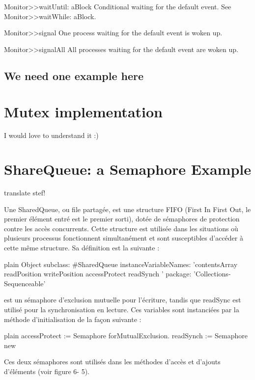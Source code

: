 \documentclass[10pt,twoside,english]{_support/latex/sbabook/sbabook}
\begin{document}
Monitor\textgreater{}\textgreater{}waitUntil: aBlock
Conditional waiting for the default event.
See Monitor\textgreater{}\textgreater{}waitWhile: aBlock.

Monitor\textgreater{}\textgreater{}signal
One process waiting for the default event is woken up.

Monitor\textgreater{}\textgreater{}signalAll
All processes waiting for the default event are woken up.
\section{We need one example here}\chapter{Mutex implementation}
I would love to understand it :)
\chapter{ShareQueue: a Semaphore Example}
\begin{todo}
translate stef! 
\end{todo}

Une SharedQueue, ou file partag\'{e}e, est une structure FIFO (First In First Out, le premier \'{e}l\'{e}ment entr\'{e} est le premier sorti), dot\'{e}e de s\'{e}maphores de protection contre les acc\`{e}s concurrents. Cette structure est utilis\'{e}e dans les situations o\`{u} plusieurs processus fonctionnent simultan\'{e}ment et sont susceptibles d’acc\'{e}der \`{a} cette m\^{e}me structure.
Sa d\'{e}finition est la suivante :

\begin{displaycode}{plain}
Object subclass: #SharedQueue
	instanceVariableNames: 'contentsArray readPosition writePosition accessProtect readSynch ' 
	package: 'Collections-Sequenceable'
\end{displaycode}

 est un s\'{e}maphore d’exclusion mutuelle pour l’\'{e}criture, tandis que readSync est utilis\'{e} pour la synchronisation en lecture. Ces variables sont instanci\'{e}es par la m\'{e}thode d’initialisation de la fa\c{c}on suivante :

\begin{displaycode}{plain}
accessProtect := Semaphore forMutualExclusion.
readSynch := Semaphore new
\end{displaycode}

Ces deux s\'{e}maphores sont utilis\'{e}s dans les m\'{e}thodes d’acc\`{e}s et d’ajouts d’\'{e}l\'{e}ments (voir figure 6- 5).
\end{document}
